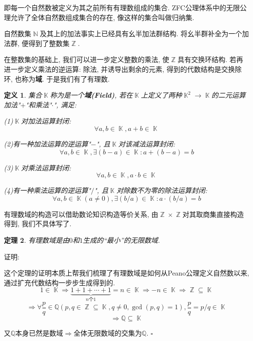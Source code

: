 \documentclass[UTF8]{ctexart}
\newcommand{\<}{\langle}
\renewcommand{\>}{\rangle}
\DeclareMathOperator{\K}{\mathbb{K}}
\DeclareMathOperator{\Z}{\mathbb{Z}}
\DeclareMathOperator{\N}{\mathbb{N}}
\newtheorem{thm}{定理}[subsection]
\newtheorem{dfn}[thm]{定义}
\begin{document}
            即每一个自然数被定义为其之前所有有理数组成的集合. ZFC公理体系中的无限公理允许了全体自然数组成集合的存在, 像这样的集合叫做归纳集. 

            自然数集$\N$及其上的加法事实上已经具有幺半加法群结构. 将幺半群补全为一个加法群, 便得到了整数集$\Z$. 

            在整数集的基础上, 我们可以进一步定义整数的乘法, 使$\Z$具有交换环结构. 若再进一步定义乘法的逆运算: 除法, 并诱导出剩余的元素, 得到的代数结构是交换除环, 也称为\textbf{域}. 于是我们有了有理数. 

            \begin{dfn}
                集合$\K$称为是一个\textbf{域(Field)}, 若在$\K$上定义了两种$\K^2\to \K$的二元运算加法"$+$"和乘法"$\cdot$", 满足: 
                
                (1)$\K$对加法运算封闭: 
                \[\forall a,b\in \K, a+b\in \K\]
                
                (2)有一种加法运算的逆运算"$-$", 且$\K$对该减法运算封闭: 
                \[\forall a,b\in \K, \exists (b-a)\in \K: a+(b-a)=b\]
                
                (3)$\K$对乘法运算封闭: 
                \[\forall a,b\in \K, a\cdot b\in \K\]
                
                (4)有一种乘法运算的逆运算"$/$", 且$\K$对除数不为零的除法运算封闭: 
                \[\forall a,b\in \K(a\neq 0), \exists (b/a)\in \K: a\cdot(b/a)=b\]
            \end{dfn}

            有理数域的构造可以借助数论知识构造等价关系, 由$\Z\times\Z$对其取商集直接构造得到, 我们不具体写了. 
                
            \begin{thm}
                有理数域是由$0$和$1$生成的``最小''的无限数域. 
            \end{thm}

            证明: 
                
                这个定理的证明本质上帮我们梳理了有理数域是如何从Peano公理定义自然数以来, 通过扩充代数结构一步步生成得到的. 
                \[1\in\K\Longrightarrow\underbrace{1+1+\cdots +1}_{n\mbox{个}1}=n \in \K\Longrightarrow -n\in \K\Longrightarrow \Z \subseteq \K\]
                \[\Longrightarrow \forall \frac{p}{q}\in \mathbb{Q}(p,q\in \Z\subseteq \K, q\neq 0, \gcd(p,q)=1), \frac{p}{q}=p/q \in \K\]
                \[\Longrightarrow \mathbb{Q} \subseteq \K\]
                
                又$\mathbb{Q}$本身已然是数域$\Longrightarrow$全体无限数域的交集为$\mathbb{Q}$. $\square$
            
\end{document}
